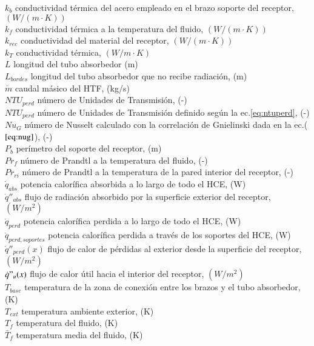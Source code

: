 \begin{tabbing}
$k_b$ \> conductividad térmica del acero empleado en el brazo soporte del receptor,  $(W/(m\cdot K))$ \\
$k_f$ \> conductividad térmica a la temperatura del fluido, $(W/(m\cdot K))$ \\
$k_{rec}$ \> conductividad del material del receptor, $(W/(m\cdot K))$ \\
$k_T$ \> conductividad térmica, $(W/m \cdot K)$ \\
$L$  \> longitud del tubo absorbedor (m) \\
$L_{bordes}$  \> longitud del tubo absorbedor que no recibe radiación, (m) \\
$\dot m$ \> caudal másico del HTF, (kg/s) \\
$NTU_{perd}$ \> número de Unidades de Transmisión, (-) \\
$NTU_{perd}$ \> número de Unidades de Transmisión definido según la ec.\eqref{eq:ntuperd}, (-) \\
$Nu_{G}$ \> número de Nusselt calculado con la correlación de Gnielinski dada en la ec.($\eqref{eq:nug}$), (-) \\
$P_b$ \> perímetro del soporte del receptor, (m) \\
$Pr_f$ \> número de Prandtl a la temperatura del fluido, (-) \\
$Pr_{ri}$ \> número de Prandtl a la temperatura de la pared interior del receptor, (-) \\
$\dot q_{abs}$ \> potencia calorífica absorbida a lo largo de todo el HCE, (W) \\
$\dot q''_{abs}$ \> flujo de radiación absorbido por la superficie exterior del receptor, $(W/m^{2})$ \\
$\dot q_{perd}$ \> potencia calorífica perdida a lo largo de todo el HCE, (W) \\
$\dot q_{perd,soportes}$ \> potencia calorífica perdida a través de los soportes del HCE, (W) \\
$\dot q''_{perd}(x)$ \> flujo de calor de pérdidas al exterior desde la superficie del receptor, $(W/m^{2})$ \\
$\dot q"_{u}(x)$ \> flujo de calor útil hacia el interior del receptor,  $(W/m^{2})$ \\ 
$T_{base}$ \> temperatura de la zona de conexión entre los brazos y el tubo absorbedor, (K) \\
$T_{ext}$ \> temperatura ambiente exterior, (K) \\
$T_{f}$ \> temperatura del fluido, (K) \\
$\bar{T}_{f}$ \> temperatura media del fluido, (K) \\

\end{tabbing}
